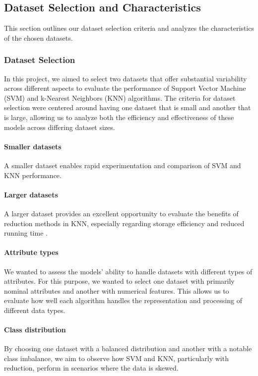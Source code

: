 \subsection{Dataset Selection and Characteristics}
\label{subsec:dataset}

This section outlines our dataset selection criteria and analyzes the characteristics of the chosen datasets.

\subsubsection{Dataset Selection}
In this project, we aimed to select two datasets that offer substantial variability across different aspects to evaluate the performance of Support Vector Machine (SVM) and k-Nearest Neighbors (KNN) algorithms.
The criteria for dataset selection were centered around having one dataset that is small and another that is large, allowing us to analyze both the efficiency and effectiveness of these models across differing dataset sizes.
\paragraph{Smaller datasets} A smaller dataset enables rapid experimentation and comparison of SVM and KNN performance.
\paragraph{Larger datasets} A larger dataset provides an excellent opportunity to evaluate the benefits of reduction methods in KNN, especially regarding storage efficiency and reduced running time \cite{distance_func_knn}.

\paragraph{Attribute types} We wanted to assess the models' ability to handle datasets with different types of attributes.
For this purpose, we wanted to select one dataset with primarily nominal attributes and another with numerical features.
This allows us to evaluate how well each algorithm handles the representation and processing of different data types.
\paragraph{Class distribution} By choosing one dataset with a balanced distribution and another with a notable class imbalance, we aim to observe how SVM and KNN, particularly with reduction, perform in scenarios where the data is skewed.
